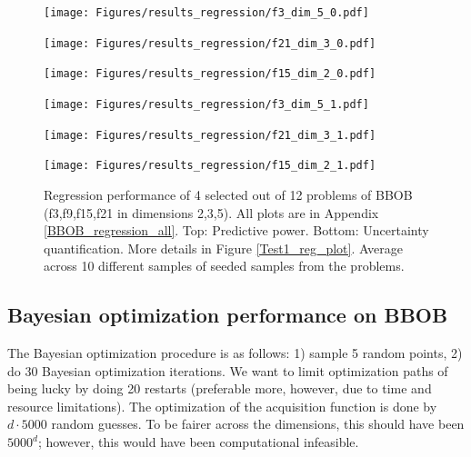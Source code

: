 \begin{figure}[H]
  \centering
  \begin{minipage}[b]{0.32\textwidth}
   \texttt{[image: Figures/results\_regression/f3\_dim\_5\_0.pdf]}
  \end{minipage}
  \hfill
  \begin{minipage}[b]{0.32\textwidth}
    \texttt{[image: Figures/results\_regression/f21\_dim\_3\_0.pdf]}
   \end{minipage}
   \hfill
   \begin{minipage}[b]{0.32\textwidth}
    \texttt{[image: Figures/results\_regression/f15\_dim\_2\_0.pdf]}
   \end{minipage}
   
     \begin{minipage}[b]{0.32\textwidth}
   \texttt{[image: Figures/results\_regression/f3\_dim\_5\_1.pdf]}
  \end{minipage}
  \hfill
  \begin{minipage}[b]{0.32\textwidth}
    \texttt{[image: Figures/results\_regression/f21\_dim\_3\_1.pdf]}
   \end{minipage}
   \hfill
   \begin{minipage}[b]{0.32\textwidth}
    \texttt{[image: Figures/results\_regression/f15\_dim\_2\_1.pdf]}
   \end{minipage}
   
  \caption{Regression performance of 4 selected out of 12 problems of BBOB (f3,f9,f15,f21 in
  dimensions 2,3,5). All plots are in Appendix \ref{BBOB_regression_all}. Top: Predictive power. Bottom: Uncertainty
  quantification. More details in Figure \ref{Test1_reg_plot}. Average across 10 different samples
  of seeded samples from the problems.}
  \label{BBOB_regression}
\end{figure}


\subsection{Bayesian optimization performance on BBOB}
The Bayesian optimization procedure is as follows: 1) sample 5 random points, 2) do 30 Bayesian
optimization iterations. We want to limit optimization paths of being lucky by doing 20
restarts (preferable more, however, due to time and resource limitations). The optimization of the
acquisition function is done by $d \cdot 5000$ random guesses. To be fairer across the dimensions,
this should have been $5000^d$; however, this would have been computational infeasible. 

